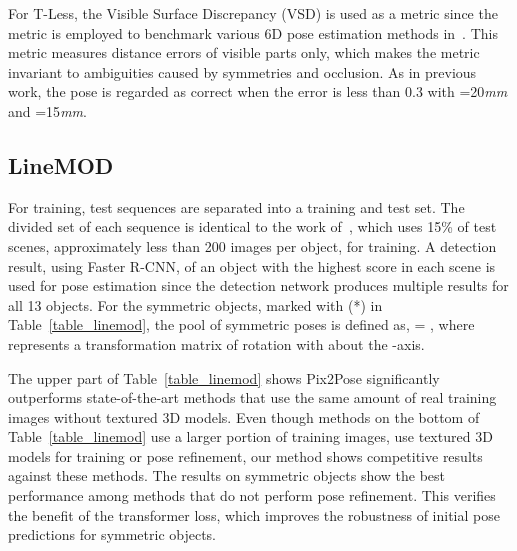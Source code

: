 \documentclass[10pt,twocolumn,letterpaper]{article}
\begin{document}
For T-Less, the Visible Surface Discrepancy (VSD) is used as a metric since the metric is employed to benchmark various 6D pose estimation methods in~\cite{Hodan_2018_ECCV_bop}. This metric measures distance errors of visible parts only, which makes the metric invariant to ambiguities caused by symmetries and occlusion. As in previous work, the pose is regarded as correct when the error is less than 0.3 with =20\textit{mm} and =15\textit{mm}. 


\subsection{LineMOD} \label{eval_linemod}
For training, test sequences are separated into a training and test set. The divided set of each sequence is identical to the work of~\cite{cnn_pose:brachmann2016uncertainty_only_rgb, Tekin_2018_CVPR}, which uses 15\% of test scenes, approximately less than 200 images per object, for training. A detection result, using Faster R-CNN, of an object with the highest score in each scene is used for pose estimation since the detection network produces multiple results for all 13 objects. For the symmetric objects, marked with (*) in Table~\ref{table_linemod}, the pool of symmetric poses  is defined as, = , where  represents a transformation matrix of rotation with  about the -axis.

The upper part of Table~\ref{table_linemod} shows Pix2Pose significantly outperforms state-of-the-art methods that use the same amount of real training images without textured 3D models. Even though methods on the bottom of Table~\ref{table_linemod} use a larger portion of training images, use textured 3D models for training or pose refinement, our method shows competitive results against these methods. The results on symmetric objects show the best performance among methods that do not perform pose refinement. This verifies the benefit of the transformer loss, which improves the robustness of initial pose predictions for symmetric objects. 
\end{document}
